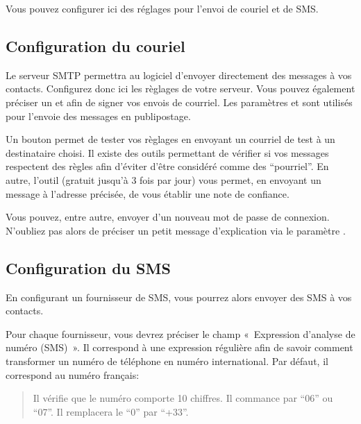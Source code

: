 \documentclass[a4paper,10pt,oneside,french]{sphinxmanual}
\begin{document}
\sphinxAtStartPar
Vous pouvez configurer ici des réglages pour l’envoi de couriel et de SMS.


\subsection{Configuration du couriel}
\label{\detokenize{mailing/configuration:configuration-du-couriel}}
\sphinxAtStartPar
Le serveur SMTP permettra au logiciel d’envoyer directement des messages à vos contacts.
Configurez donc ici les règlages de votre serveur.
Vous pouvez également préciser un  et  afin de signer vos envois de courriel.
Les paramètres  et  sont utilisés pour l’envoie des messages en publipostage.

\sphinxAtStartPar
Un bouton  permet de tester vos règlages en envoyant un courriel de test à un destinataire choisi.
Il existe des outils permettant de vérifier si vos messages respectent des règles afin d’éviter d’être considéré comme des “pourriel”.
En autre, l’outil  (gratuit jusqu’à 3 fois par jour) vous permet, en envoyant un message à l’adresse précisée, de vous établir une note de confiance.

\sphinxAtStartPar
Vous pouvez, entre autre, envoyer d’un nouveau mot de passe de connexion.
N’oubliez pas alors de préciser un petit message d’explication via le paramètre .


\subsection{Configuration du SMS}
\label{\detokenize{mailing/configuration:configuration-du-sms}}
\sphinxAtStartPar
En configurant un fournisseur de SMS, vous pourrez alors envoyer des SMS à vos contacts.

\sphinxAtStartPar
Pour chaque fournisseur, vous devrez préciser le champ « Expression d’analyse de numéro (SMS) ».
Il correspond à une expression régulière afin de savoir comment transformer un numéro de téléphone en numéro international.
Par défaut, il correspond au numéro français: 
\begin{quote}

\sphinxAtStartPar
Il vérifie que le numéro comporte 10 chiffres.
Il commance par “06” ou “07”.
Il remplacera le “0” par “+33”.
\end{quote}
\end{document}
